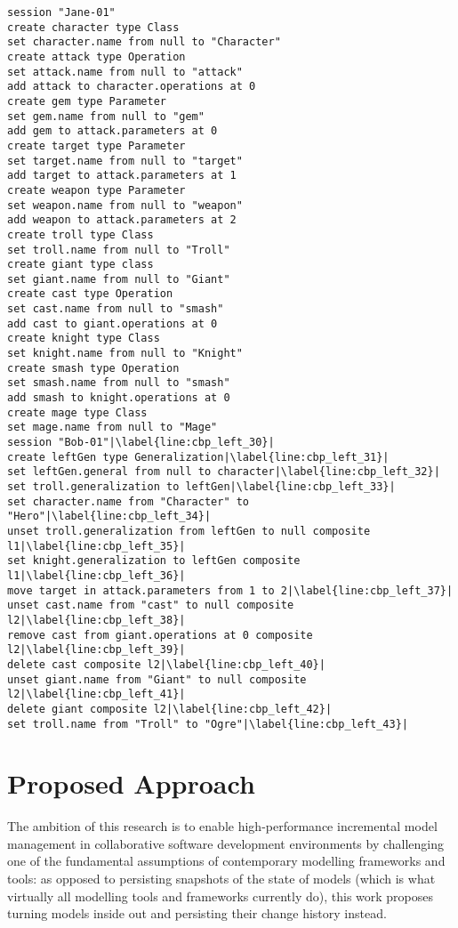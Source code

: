 \begin{lstlisting}[style=eol,escapechar=|,caption={The complete version of Bob's change events in Listing \ref{lst:cbp_left}.},label=lst:cbp_left_full]
session "Jane-01"
create character type Class
set character.name from null to "Character" 
create attack type Operation
set attack.name from null to "attack" 
add attack to character.operations at 0
create gem type Parameter
set gem.name from null to "gem" 
add gem to attack.parameters at 0
create target type Parameter
set target.name from null to "target" 
add target to attack.parameters at 1
create weapon type Parameter
set weapon.name from null to "weapon" 
add weapon to attack.parameters at 2
create troll type Class
set troll.name from null to "Troll" 
create giant type class
set giant.name from null to "Giant"
create cast type Operation
set cast.name from null to "smash"
add cast to giant.operations at 0
create knight type Class
set knight.name from null to "Knight"
create smash type Operation
set smash.name from null to "smash"
add smash to knight.operations at 0
create mage type Class
set mage.name from null to "Mage" 
session "Bob-01"|\label{line:cbp_left_30}|
create leftGen type Generalization|\label{line:cbp_left_31}|
set leftGen.general from null to character|\label{line:cbp_left_32}|
set troll.generalization to leftGen|\label{line:cbp_left_33}|
set character.name from "Character" to "Hero"|\label{line:cbp_left_34}|
unset troll.generalization from leftGen to null composite l1|\label{line:cbp_left_35}|
set knight.generalization to leftGen composite l1|\label{line:cbp_left_36}|
move target in attack.parameters from 1 to 2|\label{line:cbp_left_37}|
unset cast.name from "cast" to null composite l2|\label{line:cbp_left_38}|
remove cast from giant.operations at 0 composite l2|\label{line:cbp_left_39}|
delete cast composite l2|\label{line:cbp_left_40}|
unset giant.name from "Giant" to null composite l2|\label{line:cbp_left_41}|
delete giant composite l2|\label{line:cbp_left_42}|
set troll.name from "Troll" to "Ogre"|\label{line:cbp_left_43}|
\end{lstlisting}


\section{Proposed Approach}
\label{sec:proposed_approach}

The ambition of this research is to enable high-performance incremental model management in collaborative software development environments by challenging one of the fundamental assumptions of contemporary modelling frameworks and tools: as opposed to persisting snapshots of the state of models (which is what virtually all modelling tools and frameworks currently do), this work proposes turning models inside out and persisting their change history instead.

